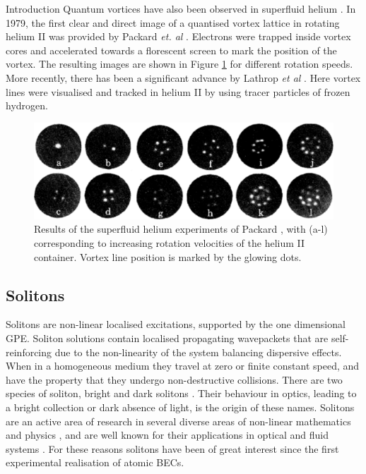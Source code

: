 \begin{chapter}{\label{cha:bose_gases}Introduction}
Quantum vortices have also been observed in superfluid helium \cite{Vinen218}. In 1979, the first clear and direct image of a quantised vortex lattice in rotating helium II was provided by Packard {\it et. al} \cite{PhysRevLett.43.214}. Electrons were trapped inside vortex cores and accelerated towards a florescent screen to mark the position of the vortex. The resulting images are shown in Figure \ref{fig:hevorts} for different rotation speeds. More recently, there has been a significant advance by Lathrop {\it et al} \cite{Bewley09}. Here vortex lines were visualised and tracked in helium II by using tracer particles of frozen hydrogen.

\begin{figure}
\includegraphics[width=\linewidth]{intro/packard}
\caption{\label{fig:hevorts} Results of the superfluid helium experiments of Packard \cite{PhysRevLett.43.214}, with (a-l) corresponding to increasing rotation velocities of the helium II container. Vortex line position is marked by the glowing dots.}
\end{figure}

\subsection{Solitons}
Solitons are non-linear localised excitations, supported by the one dimensional GPE. Soliton solutions contain localised propagating wavepackets that are self-reinforcing due to the non-linearity of the system balancing dispersive effects. When in a homogeneous medium they travel at zero or finite constant speed, and have the property that they undergo non-destructive collisions. There are two species of soliton, bright \cite{PhysRevA.62.063611} and dark solitons \cite{PhysRevA.62.063610}. Their behaviour in optics, leading to a bright collection or dark absence of light, is the origin of these names. Solitons are an active area of research in several diverse areas of non-linear mathematics and physics \cite{drazin1989solitons,remoissenet2013waves}, and are well known for their applications in optical and fluid systems \cite{yu_kivshar_1998}. For these reasons solitons have been of great interest \cite{kevrekidis2007emergent,1751-8121-43-21-213001} since the first experimental realisation of atomic BECs.


\end{chapter}
